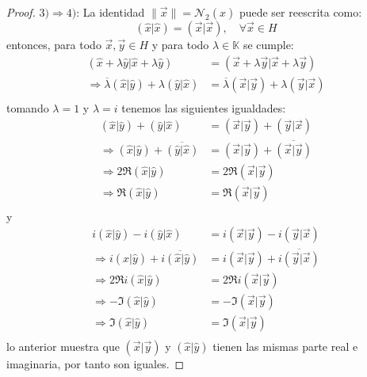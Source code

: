 \documentclass[12pt]{report}
\theoremstyle{largebreak}
\newcommand\norm[1]{\ensuremath{\|#1\|}}
\newcommand\pint[2]{\ensuremath{\left(#1\big| #2\right)}}
\newcommand\conj[1]{\ensuremath{\overline{#1}}}
\newcommand{\N}[2]{\ensuremath{\mathcal{N}_{#1}\left(#2\right)}}
\begin{document}
\begin{proof}
        $3)\Rightarrow 4)$: La identidad $\norm{\vec{x}}=\N{2}{\hat{x}}$ puede ser reescrita como:
        \begin{equation*}
            \pint{\hat{x}}{\hat{x}}=\pint{\vec{x}}{\vec{x}},\quad\forall\vec{x}\in H
        \end{equation*}
        entonces, para todo $\vec{x},\vec{y}\in H$ y para todo $\lambda\in\mathbb{K}$ se cumple:
        \begin{equation*}
            \begin{split}
                \pint{\hat{x}+\lambda\hat{y}}{\hat{x}+\lambda\hat{y}}&=\pint{\vec{x}+\lambda\vec{y}}{\vec{x}+\lambda\vec{y}}\\
                \Rightarrow \conj{\lambda}\pint{\hat{x}}{\hat{y}}+\lambda\pint{\hat{y}}{\hat{x}} &=\conj{\lambda}\pint{\vec{x}}{\vec{y}}+\lambda\pint{\vec{y}}{\vec{x}} \\
            \end{split}
        \end{equation*}
        tomando $\lambda=1$ y $\lambda=i$ tenemos las siguientes igualdades:
        \begin{equation*}
            \begin{split}
                \pint{\hat{x}}{\hat{y}}+\pint{\hat{y}}{\hat{x}} &=\pint{\vec{x}}{\vec{y}}+\pint{\vec{y}}{\vec{x}}\\
                \Rightarrow \pint{\hat{x}}{\hat{y}}+\conj{\pint{\hat{y}}{\hat{x}}}&=\pint{\vec{x}}{\vec{y}}+\conj{\pint{\vec{x}}{\vec{y}}} \\
                \Rightarrow 2\Re\pint{\hat{x}}{\hat{y}}&=2\Re\pint{\vec{x}}{\vec{y}}\\
                \Rightarrow \Re\pint{\hat{x}}{\hat{y}}&=\Re\pint{\vec{x}}{\vec{y}}\\
            \end{split}
        \end{equation*}
        y
        \begin{equation*}
            \begin{split}
                i\pint{\hat{x}}{\hat{y}}-i\pint{\hat{y}}{\hat{x}}&=i\pint{\vec{x}}{\vec{y}}-i\pint{\vec{y}}{\vec{x}}\\
                \Rightarrow i\pint{\hat{x}}{\hat{y}}+\conj{i\pint{\hat{x}}{\hat{y}}}&=i\pint{\vec{x}}{\vec{y}}+\conj{i\pint{\vec{y}}{\vec{x}}}\\
                \Rightarrow 2\Re i\pint{\hat{x}}{\hat{y}} &=2\Re i\pint{\vec{x}}{\vec{y}} \\
                \Rightarrow -\Im \pint{\hat{x}}{\hat{y}} &=-\Im \pint{\vec{x}}{\vec{y}} \\
                \Rightarrow \Im \pint{\hat{x}}{\hat{y}} &=\Im \pint{\vec{x}}{\vec{y}} \\
            \end{split}
        \end{equation*}
        lo anterior muestra que $\pint{\vec{x}}{\vec{y}}$ y $\pint{\hat{x}}{\hat{y}}$ tienen las mismas parte real e imaginaria, por tanto son iguales.


\end{proof}
\end{document}

